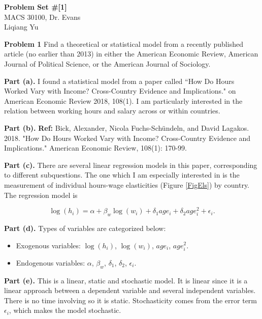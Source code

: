 \documentclass[letterpaper,12pt]{article}
\theoremstyle{definition}
\begin{document}
\begin{flushleft}
  \textbf{\large{Problem Set \#[1]}} \\
  MACS 30100, Dr. Evans \\
  Liqiang Yu
\end{flushleft}

\vspace{5mm}

\noindent\textbf{Problem 1}
Find a theoretical or statistical model from a recently published article (no earlier than 2013) in either the American Economic Review, American Journal of Political Science, or the American Journal of Sociology.

\textbf{Part (a).} 
I found a statistical model from a paper called ``How Do Hours Worked Vary with Income? Cross-Country Evidence and Implications." on American Economic Review 2018, 108(1). I am particularly interested in the relation between working hours and salary across or within countries.

\textbf{Part (b).} \textbf{Ref:} Bick, Alexander, Nicola Fuchs-Schündeln, and David Lagakos. 2018. "How Do Hours Worked Vary with Income? Cross-Country Evidence and Implications." American Economic Review, 108(1): 170-99.

\textbf{Part (c).} 
There are several linear regression models in this paper, corresponding to different subquestions. The one which I am especially interested in is the measurement of individual hours-wage elasticities (Figure \ref{FigEls}) by country. The regression model is 

\begin{equation*}
  \log(h_i)= \alpha + \beta_w \log(w_i)+\delta_1 age_i + \delta_2 age_{i}^2 + \epsilon_i.
\end{equation*}

\textbf{Part (d).} 
Types of variables are categorized below:
\begin{itemize}
\item Exogenous variables: $\log(h_i)$, $\log(w_i)$, $age_i$, $age_{i}^2$. 
\item Endogenous variables: $\alpha$, $\beta_w$, $\delta_1$, $\delta_2$, $\epsilon_i$.
\end{itemize}

  
\textbf{Part (e).} This is a linear, static and stochastic model. It is linear since it is a linear approach between a dependent variable and several independent variables. There is no time involving so it is static. Stochasticity comes from the error term $\epsilon_i$, which makes the model stochastic.
\end{document}
